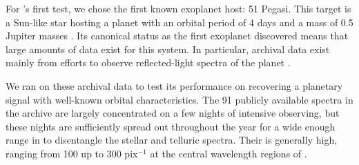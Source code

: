 \documentclass[twocolumn]{aastex62}
\begin{document}
For \wobble's first test, we chose the first known exoplanet host: 51 Pegasi. 
This target is a Sun-like star hosting a planet with an orbital period of 4 days and a mass of 0.5 Jupiter masses \citep{Mayor1995}. 
Its canonical status as the first exoplanet discovered means that large amounts of data exist for this system. 
In particular, archival \HARPS data exist mainly from efforts to observe reflected-light spectra of the planet \citep{Martins2015}. 

We ran \wobble on these archival data to test its performance on recovering a planetary signal with well-known orbital characteristics.
The 91 publicly available spectra in the \HARPS archive are largely concentrated on a few nights of intensive observing, but these nights are sufficiently spread out throughout the year for a wide enough range in \BERV to disentangle the stellar and telluric spectra. 
Their \SNR is generally high, ranging from 100 up to 300 pix$^{-1}$ at the central wavelength regions of \HARPS.
\end{document}
